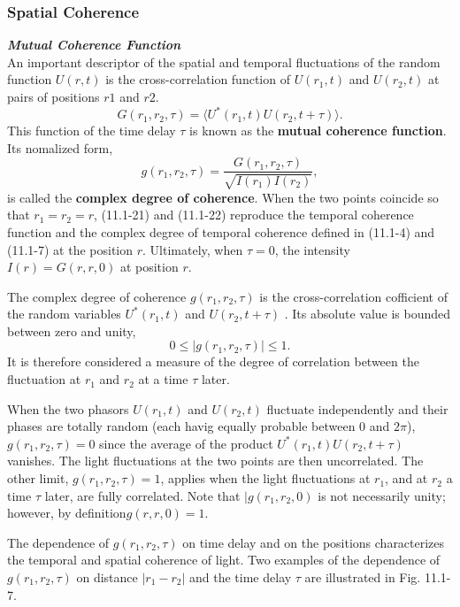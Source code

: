 \documentclass{article}
\numberwithin{figure}{subsection}
\numberwithin{table}{subsection}
\begin{document}
\subsubsection{Spatial Coherence}
\endgroup
\noindent\textcolor{ksc}{\textbf{\textsl{Mutual Coherence Function}}}\\
An important descriptor of the spatial and temporal fluctuations of the random function $ U(r,t) $ is the cross-correlation function of $ U(r_1,t) $ and $ U(r_2,t) $ at pairs of positions $ r1 $ and $ r2 $.
\begin{equation}
G(r_1, r_2, \tau) = \langle U^\ast (r_1, t) U(r_2, t + \tau) \rangle .
\end{equation}
This function of the time delay $\tau$ is known as the \textbf{mutual coherence function}. Its nomalized form,
\begin{equation}
g(r_1, r_2, \tau) = \frac{G(r_1, r_2, \tau)}{\sqrt{I(r_1) I(r_2)}},
\end{equation} 
is called the \textbf{complex degree of coherence}. When the two points coincide so that $ r_1 = r_2 = r $, (11.1-21) and (11.1-22) reproduce the temporal coherence function and the complex degree of temporal coherence defined in (11.1-4) and (11.1-7) at the position $ r $. Ultimately, when $ \tau = 0 $, the intensity $ I(r) = G(r, r, 0) $ at position $ r $.
\par The complex degree of coherence $ g(r_1, r_2, \tau) $ is the cross-correlation cofficient of the random variables $ U^\ast (r_1, t) $ and $ U(r_2, t + \tau) $ . Its absolute value is bounded between zero and unity,
\begin{equation}
0 \leq \lvert g(r_1, r_2, \tau) \rvert \leq 1 .
\end{equation}
It is therefore considered a measure of the degree of correlation between the fluctuation at $ r_1 $ and $ r_2 $ at a time $ \tau $ later.
\par When the two phasors $ U(r_1, t) $ and $ U(r_2, t) $ fluctuate independently and their phases are totally random (each havig equally probable between 0 and $ 2\pi $), $ g(r_1, r_2, \tau) = 0 $ since the average of the product $ U^\ast (r_1, t) U(r_2, t + \tau) $ vanishes. The light fluctuations at the two points are then uncorrelated. The other limit, $ g(r_1, r_2, \tau) = 1 $, applies when the light fluctuations at  $ r_1 $, and at $ r_2 $ a time $ \tau $ later, are fully correlated. Note that $ \lvert g(r_1, r_2, 0) $ is not necessarily unity; however, by definition$ g(r, r, 0) = 1 $.
\par The dependence of $ g(r_1, r_2, \tau) $ on time delay and on the positions characterizes the temporal and spatial coherence of light. Two examples of the dependence of  $ g(r_1, r_2, \tau) $ on distance $ \lvert r_1 - r_2 \rvert $ and the time delay $ \tau $ are illustrated in Fig. 11.1-7.
\end{document}

